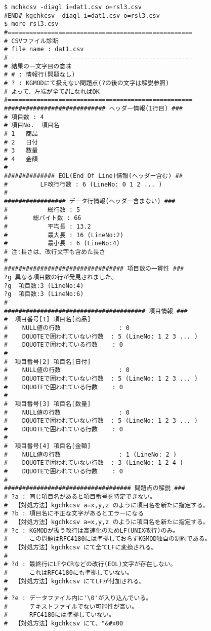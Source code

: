 \begin{Verbatim}[baselinestretch=0.7,frame=single]
$ mchkcsv -diagl i=dat1.csv o=rsl3.csv
#END# kgchkcsv -diagl i=dat1.csv o=rsl3.csv
$ more rsl3.csv
#===================================================
# CSVファイル診断 
# file name : dat1.csv
#---------------------------------------------------
# 結果の一文字目の意味
# # : 情報行(問題なし)
# ? : KGMODにて扱えない問題点(?の後の文字は解説参照)
# よって、左端が全て#になればOK
#===================================================
############################ ヘッダー情報(1行目) ###
# 項目数 : 4
# 項目No.  項目名
# 1   商品
# 2   日付
# 3   数量
# 4   金額
#
############## EOL(End Of Line)情報(ヘッダー含む) ##
#         LF改行行数 : 6 (LineNo: 0 1 2 ... )
#
################# データ行情報(ヘッダー含まない) ###
#           総行数 : 5
#       総バイト数 : 66
#           平均長 : 13.2
#           最大長 : 16 (LineNo:2)
#           最小長 : 6 (LineNo:4)
# 注:長さは、改行文字も含めた長さ
#
################################# 項目数の一貫性 ###
?g 異なる項目数の行が発見されました。
?g  項目数:3 (LineNo:4)
?g  項目数:3 (LineNo:6)
#
####################################### 項目情報 ###
#  項目番号[1] 項目名[商品]
#    NULL値の行数                : 0 
#    DQUOTEで囲われていない行数  : 5 (LineNo: 1 2 3 ... )
#    DQUOTEで囲われている行数    : 0 
#
#  項目番号[2] 項目名[日付]
#    NULL値の行数                : 0 
#    DQUOTEで囲われていない行数  : 5 (LineNo: 1 2 3 ... )
#    DQUOTEで囲われている行数    : 0 
#
#  項目番号[3] 項目名[数量]
#    NULL値の行数                : 0 
#    DQUOTEで囲われていない行数  : 5 (LineNo: 1 2 3 ... )
#    DQUOTEで囲われている行数    : 0 
#
#  項目番号[4] 項目名[金額]
#    NULL値の行数                : 1 (LineNo: 2 )
#    DQUOTEで囲われていない行数  : 3 (LineNo: 1 2 4 )
#    DQUOTEで囲われている行数    : 0 
#
################################### 問題点の解説 ###
# ?a : 同じ項目名があると項目番号を特定できない。
#  【対処方法】kgchkcsv a=x,y,z のように項目名を新たに指定する。
# ?b : 項目名に不正な文字があるとエラーになる
#  【対処方法】kgchkcsv a=x,y,z のように項目名を新たに指定する。
# ?c : KGMODが扱う改行は高速化のためLF(UNIX改行)のみ。
#      この問題はRFC4180には準拠しておらずKGMOD独自の制約である。
#  【対処方法】kgchkcsv にて全てLFに変換される。
#
# ?d : 最終行にLFやCRなどの改行(EOL)文字が存在しない。
#      これはRFC4180にも準拠していない。
#  【対処方法】kgchkcsv にてLFが付加される。
#
# ?e : データファイル内に'\0'が入り込んでいる。
#      テキストファイルでない可能性が高い。
#      RFC4180には準拠していない。
#  【対処方法】kgchkcsv にて、"&#x00

\end{Verbatim}
